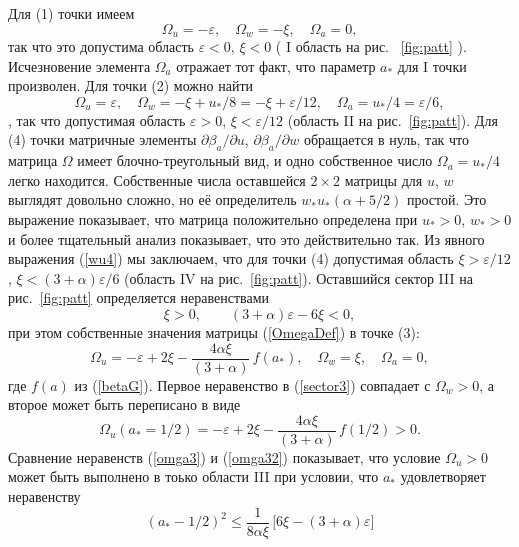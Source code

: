 \documentclass[a4paper,10pt]{article}
\begin{document}
Для (1) точки имеем \[ \Omega_{u} = -\varepsilon, \quad  \Omega_{w} = -\xi, \quad \Omega_{a} = 0, \]
 так что это допустима область $\varepsilon<0$, $\xi<0$ ( I область на рис. ~\ref{fig:patt} ).
Исчезновение элемента $\Omega_{a}$ отражает тот факт, что параметр $a_{*}$  для I точки произволен.
Для точки (2) можно найти  \[ \Omega_{u} = \varepsilon, \quad
\Omega_{w} = -\xi+u_{*}/8 = -\xi+\varepsilon/12,
\quad \Omega_{a} = u_{*}/4 = \varepsilon/6, \], так что  допустимая область $\varepsilon>0$, $\xi<\varepsilon/12$
(область II на рис.~\ref{fig:patt}).
Для (4) точки матричные  элементы $\partial\beta_{a}/\partial u$,
$\partial\beta_{a}/\partial w$   обращается в нуль, 
так что матрица $\Omega$ имеет блочно-треугольный вид, и одно собственное число $\Omega_{a} = u_{*}/4$ легко находится.
Собственные числа оставшейся  $2\times2$  матрицы для $u$, $w$  выглядят довольно сложно, но её определитель  $w_{*}u_{*} (\alpha+5/2)$ простой.
Это выражение показывает, что матрица положительно определена при $u_{*}>0$, $w_{*}>0$ и более тщательный анализ показывает, что это действительно так.
Из явного выражения  (\ref{wu4}) мы заключаем, что для точки (4) допустимая область $\xi>\varepsilon/12$,
$\xi< (3+\alpha) \varepsilon/6$  (область IV на рис.~\ref{fig:patt}).
Оставшийся сектор  III на рис.~\ref{fig:patt} определяется неравенствами 
\begin{equation}
\xi > 0, \qquad (3+\alpha) \varepsilon -6\xi<0,
\label{sector3}
\end{equation}
при этом собственные значения матрицы (\ref{OmegaDef}) в  точке (3):
\begin{equation}
\Omega_{u} =  -\varepsilon+2\xi- \frac{4\alpha\xi}{(3+\alpha)}\, f(a_{*}),
\quad \Omega_{w} = \xi, \quad \Omega_{a} = 0,
\label{omga3}
\end{equation}
где $f(a)$ из (\ref{betaG}).
Первое неравенство в (\ref{sector3}) совпадает с $\Omega_{w}>0$, а второе 
может быть переписано в виде 
\begin{equation}
\Omega_{u}({a_{*}=1/2}) = -\varepsilon+2\xi-
\frac{4\alpha\xi}{(3+\alpha)}\, f(1/2) >0.
\label{omga32}
\end{equation}
Сравнение неравенств (\ref{omga3}) и (\ref{omga32}) показывает, что условие
 $\Omega_{u}>0$  может быть выполнено в тоько области III при условии, что 
 $a_{*}$  удовлетворяет неравенству 
\begin{equation}
(a_{*}-1/2)^{2} \le \frac{1}{8\alpha\xi}\,
\bigl[ 6\xi- (3+\alpha)\varepsilon \bigr]
\label{kut}
\end{equation}
\end{document}
